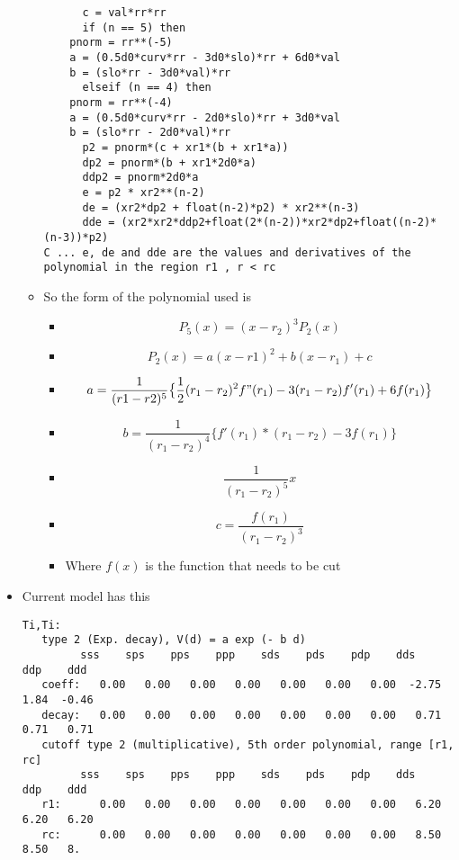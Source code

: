 \documentclass[11pt]{article}
\begin{document}
\begin{itemize}
\begin{itemize}
\begin{verbatim}
      c = val*rr*rr
      if (n == 5) then
	pnorm = rr**(-5)
	a = (0.5d0*curv*rr - 3d0*slo)*rr + 6d0*val
	b = (slo*rr - 3d0*val)*rr
      elseif (n == 4) then
	pnorm = rr**(-4)
	a = (0.5d0*curv*rr - 2d0*slo)*rr + 3d0*val
	b = (slo*rr - 2d0*val)*rr
      p2 = pnorm*(c + xr1*(b + xr1*a))
      dp2 = pnorm*(b + xr1*2d0*a)
      ddp2 = pnorm*2d0*a
      e = p2 * xr2**(n-2)
      de = (xr2*dp2 + float(n-2)*p2) * xr2**(n-3)
      dde = (xr2*xr2*ddp2+float(2*(n-2))*xr2*dp2+float((n-2)*(n-3))*p2)
C ... e, de and dde are the values and derivatives of the polynomial in the region r1 , r < rc
\end{verbatim}
\item So the form of the polynomial used is
\begin{itemize}
\item $$ P_5(x) = (x-r_2)^3 P_2(x)  $$
\item \[ P_2(x) = a(x-r1)^2 + b(x-r_1) + c \]
\item \[ a = \frac{1}{ (r1-r2)^5 } \big\{  \frac{1}{2}(r_1-r_2)^2f"(r_1) -3(r_1-r_2)f'(r_1) + 6f(r_1) \big\} \]
\item \[  b = \frac{1}{(r_1-r_2)^4} \big\{ f'(r_1)*(r_1-r_2) - 3f(r_1) \big\}  \]
\item \[ \frac{1}{(r_1 - r_2)^5} x \]
\item \[  c = \frac{ f(r_1) }{ (r_1-r_2)^3} \]
\item Where $f(x)$ is the function that needs to be cut
\end{itemize}
\end{itemize}
\item Current model has this
\begin{verbatim}
Ti,Ti:
   type 2 (Exp. decay), V(d) = a exp (- b d)
	     sss    sps    pps    ppp    sds    pds    pdp    dds    ddp    ddd
   coeff:   0.00   0.00   0.00   0.00   0.00   0.00   0.00  -2.75   1.84  -0.46
   decay:   0.00   0.00   0.00   0.00   0.00   0.00   0.00   0.71   0.71   0.71
   cutoff type 2 (multiplicative), 5th order polynomial, range [r1, rc]
	     sss    sps    pps    ppp    sds    pds    pdp    dds    ddp    ddd
   r1:      0.00   0.00   0.00   0.00   0.00   0.00   0.00   6.20   6.20   6.20
   rc:      0.00   0.00   0.00   0.00   0.00   0.00   0.00   8.50   8.50   8.
\end{verbatim}
\end{itemize}
\end{document}
